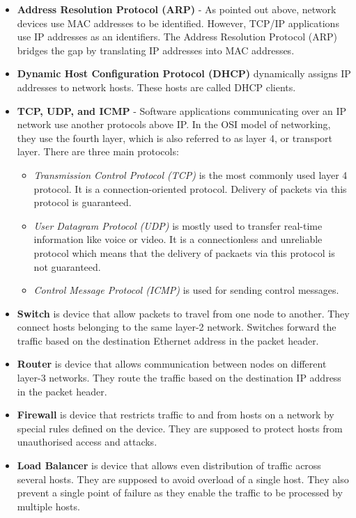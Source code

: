 \begin{itemize}
{  Each VLAN has a numerical ID between 1 and 4095. For example, a VLAN with an id of 15 will be referred to as VLAN 15.}
  \item{\textbf{Address Resolution Protocol (ARP)} - As pointed out above, network devices use MAC addresses to be identified. However, TCP/IP applications use IP addresses as an identifiers. The Address Resolution Protocol (ARP) bridges the gap by translating IP addresses into MAC addresses.}
  \item{\textbf{Dynamic Host Configuration Protocol (DHCP)} dynamically assigns IP addresses to network hosts. These hosts are called DHCP clients.}
  \item{\textbf{TCP, UDP, and ICMP} - Software applications communicating over an IP network use another protocols above IP. In the OSI model of networking, they use the fourth layer, which is also referred to as layer 4, or transport layer. There are three main protocols:
    \begin{itemize}
      \item{\textit{Transmission Control Protocol (TCP)} is the most commonly used layer 4 protocol. It is a connection-oriented protocol. Delivery of packets via this protocol is guaranteed.}
      \item{\textit{User Datagram Protocol (UDP)} is mostly used to transfer real-time information like voice or video. It is a connectionless and unreliable protocol which means that the delivery of packaets via this protocol is not guaranteed.}
      \item{\textit{Control Message Protocol (ICMP)} is used for sending control messages.}
    \end{itemize}
  }
  \item{\textbf{Switch} is device that allow packets to travel from one node to another. They connect hosts belonging to the same layer-2 network. Switches forward the traffic based on the destination Ethernet address in the packet header.}
  \item{\textbf{Router} is device that allows communication between nodes on different layer-3 networks. They route the traffic based on the destination IP address in the packet header.}
  \item{\textbf{Firewall} is device that restricts traffic to and from hosts on a network by special rules defined on the device. They are supposed to protect hosts from unauthorised access and attacks.}
  \item{\textbf{Load Balancer} is device that allows even distribution of traffic across several hosts. They are supposed to avoid overload of a single host. They also prevent a single point of failure as they enable the traffic to be processed by multiple hosts.}


\end{itemize}
